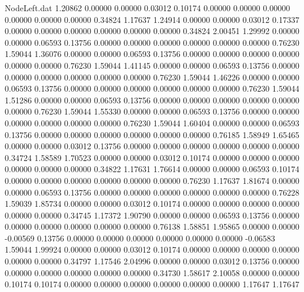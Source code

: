 \begin{filecontents}{NodeLeft.dat}
   1.20862    0.00000    0.00000     0.03012    0.10174    0.00000    0.00000    0.00000    0.00000    0.00000    0.00000    0.34824    1.17637
   1.24914    0.00000    0.00000     0.03012    0.17337    0.00000    0.00000    0.00000    0.00000    0.00000    0.00000    0.34824    2.00451
   1.29992    0.00000    0.00000     0.06593    0.13756    0.00000    0.00000    0.00000    0.00000    0.00000    0.00000    0.76230    1.59044
   1.36076    0.00000    0.00000     0.06593    0.13756    0.00000    0.00000    0.00000    0.00000    0.00000    0.00000    0.76230    1.59044
   1.41145    0.00000    0.00000     0.06593    0.13756    0.00000    0.00000    0.00000    0.00000    0.00000    0.00000    0.76230    1.59044
   1.46226    0.00000    0.00000     0.06593    0.13756    0.00000    0.00000    0.00000    0.00000    0.00000    0.00000    0.76230    1.59044
   1.51286    0.00000    0.00000     0.06593    0.13756    0.00000    0.00000    0.00000    0.00000    0.00000    0.00000    0.76230    1.59044
   1.55330    0.00000    0.00000     0.06593    0.13756    0.00000    0.00000    0.00000    0.00000    0.00000    0.00000    0.76230    1.59044
   1.60404    0.00000    0.00000     0.06593    0.13756    0.00000    0.00000    0.00000    0.00000    0.00000    0.00000    0.76185    1.58949
   1.65465    0.00000    0.00000     0.03012    0.13756    0.00000    0.00000    0.00000    0.00000    0.00000    0.00000    0.34724    1.58589
   1.70523    0.00000    0.00000     0.03012    0.10174    0.00000    0.00000    0.00000    0.00000    0.00000    0.00000    0.34822    1.17631
   1.76614    0.00000    0.00000     0.06593    0.10174    0.00000    0.00000    0.00000    0.00000    0.00000    0.00000    0.76230    1.17637
   1.81674    0.00000    0.00000     0.06593    0.13756    0.00000    0.00000    0.00000    0.00000    0.00000    0.00000    0.76228    1.59039
   1.85734    0.00000    0.00000     0.03012    0.10174    0.00000    0.00000    0.00000    0.00000    0.00000    0.00000    0.34745    1.17372
   1.90790    0.00000    0.00000     0.06593    0.13756    0.00000    0.00000    0.00000    0.00000    0.00000    0.00000    0.76138    1.58851
   1.95865    0.00000    0.00000    -0.00569    0.13756    0.00000    0.00000    0.00000    0.00000    0.00000    0.00000   -0.06583    1.59044
   1.99924    0.00000    0.00000     0.03012    0.10174    0.00000    0.00000    0.00000    0.00000    0.00000    0.00000    0.34797    1.17546
   2.04996    0.00000    0.00000     0.03012    0.13756    0.00000    0.00000    0.00000    0.00000    0.00000    0.00000    0.34730    1.58617
   2.10058    0.00000    0.00000     0.10174    0.10174    0.00000    0.00000    0.00000    0.00000    0.00000    0.00000    1.17647    1.17647

\end{filecontents}
